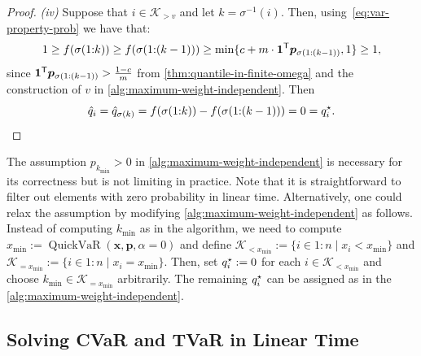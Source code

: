 \documentclass[10pt]{article} %
\begin{document}
\begin{proof}
\emph{(iv)} Suppose that $i \in \mathcal{K}_{>v}$ and let $k = \sigma^{-1}(i)$. Then, using~\eqref{eq:var-property-prob} we have that:
\begin{align*}
  1
  \ge f(\sigma(1{:}k))
  \ge f(\sigma(1{:}(k-1))) 
  \ge \min \{c + m \cdot \bm{1}^{\mathsf{T}} \bm{p}_{\sigma(1{:}(k-1))}, 1\}
  \ge 1,
\end{align*}
since $\bm{1}^{\mathsf{T}}\bm{p}_{\sigma(1{:}(k-1))} > \frac{1-c}{m}$ from \cref{thm:quantile-in-finite-omega} and the construction of $v$ in \cref{alg:maximum-weight-independent}. Then
\[
  \hat{q}_i = \hat{q}_{\sigma(k)}
  =  f(\sigma(1{:}k)) - f(\sigma(1{:}(k-1)))
  = 0 = q^{\mathnormal{\star}}_i.
\]

\end{proof}


\begin{remark}\label{rem:relax-ess-inf}
The assumption $p_{k_{\min}} >0$ in \cref{alg:maximum-weight-independent} is necessary for its correctness but is not limiting in practice. Note that it is straightforward to filter out elements with zero probability in linear time. Alternatively, one could relax the assumption by modifying \cref{alg:maximum-weight-independent} as follows. Instead of computing $k_{\min}$ as in the algorithm, we need to compute $x_{\min} := \operatorname{QuickVaR}(\bm{x}, \bm{p}, \alpha = 0)$ and define $\mathcal{K}_{< x_{\min}} := \{ i \in  1{:}n \mid x_i < x_{\min} \}$ and $\mathcal{K}_{= x_{\min}} := \{ i \in 1{:}n \mid x_i = x_{\min} \}$. Then, set $q_i^{\mathnormal{\star}} := 0$ for each $i \in \mathcal{K}_{<x_{\min}}$ and choose $k_{\min} \in \mathcal{K}_{=x_{\min}}$ arbitrarily. The remaining $q_i^{\mathnormal{\star}} $ can be assigned as in the \cref{alg:maximum-weight-independent}.
\end{remark}

\subsection{Solving CVaR and TVaR in Linear Time} \label{sec:cvar-tvar-are}
\end{document}
